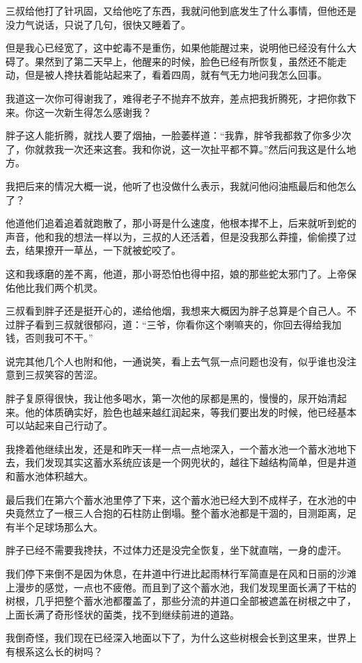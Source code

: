 三叔给他打了针巩固，又给他吃了东西，我就问他到底发生了什么事情，但他还是没力气说话，只说了几句，很快又睡着了。

但是我心已经宽了，这中蛇毒不是重伤，如果他能醒过来，说明他已经没有什么大碍了。果然到了第二天早上，他醒来的时候，脸色已经有所恢复，虽然还不能走动，但是被人搀扶着能站起来了，看着四周，就有气无力地问我怎么回事。

我道这一次你可得谢我了，难得老子不抛弃不放弃，差点把我折腾死，才把你救下来。你这一次新生得怎么感谢我？

胖子这人能折腾，就找人要了烟抽，一脸萎样道：“我靠，胖爷我都救了你多少次了，你就救我一次还来这套。我和你说，这一次扯平都不算。”然后问我这是什么地方。

我把后来的情况大概一说，他听了也没做什么表示，我就问他闷油瓶最后和他怎么了？

他道他们追着追着就跑散了，那小哥是什么速度，他根本撵不上，后来就听到蛇的声音，他和我的想法一样以为，三叔的人还活着，但是没我那么莽撞，偷偷摸了过去，结果撩开一草丛，一下就被蛇咬了。

这和我琢磨的差不离，他道，那小哥恐怕也得中招，娘的那些蛇太邪门了。上帝保佑他比我们两个机灵。

三叔看到胖子还是挺开心的，递给他烟，我想来大概因为胖子总算是个自己人。不过胖子看到三叔就很郁闷，道：“三爷，你看你这个喇嘛夹的，你回去得给我加钱，否则我可不干。”

说完其他几个人也附和他，一通说笑，看上去气氛一点问题也没有，似乎谁也没注意到三叔笑容的苦涩。

胖子复原得很快，我让他多喝水，第一次他的尿都是黑的，慢慢的，尿开始清起来。他的体质确实好，脸色也越来越红润起来，等我们要出发的时候，他已经基本可以站起来自己行动了。

我搀着他继续出发，还是和昨天一样一点一点地深入，一个蓄水池一个蓄水池地下去，我们发现其实这蓄水系统应该是一个网兜状的，越往下越结构简单，但是井道和蓄水池体积越大。

最后我们在第六个蓄水池里停了下来，这个蓄水池已经大到不成样子，在水池的中央竟然立了一根三人合抱的石柱防止倒塌。整个蓄水池都是干涸的，目测距离，足有半个足球场那么大。

胖子已经不需要我搀扶，不过体力还是没完全恢复，坐下就直喘，一身的虚汗。

我们停下来倒不是因为休息，在井道中行进比起雨林行军简直是在风和日丽的沙滩上漫步的感觉，一点也不疲倦。而且到了这个蓄水池，我们发现里面长满了干枯的树根，几乎把整个蓄水池都覆盖了，那些分流的井道口全部被遮盖在树根之中了，上面长满了奇形怪状的菌类，找不到继续前进的道路。

我倒奇怪，我们现在已经深入地面以下了，为什么这些树根会长到这里来，世界上有根系这么长的树吗？

